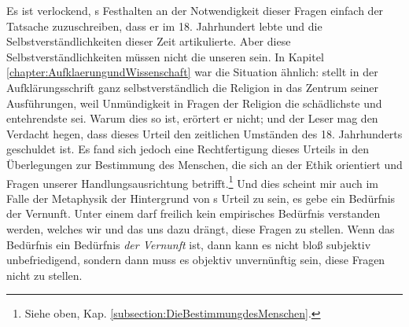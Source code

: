 \begin{nummerierung}
Es ist verlockend, s Festhalten an der Notwendigkeit dieser
Fragen einfach der Tatsache zuzuschreiben, dass er im 18. Jahrhundert lebte und
die Selbstverständlichkeiten dieser Zeit artikulierte. Aber diese
Selbstverständlichkeiten müssen nicht die unseren sein. In Kapitel
\ref{chapter:AufklaerungundWissenschaft} war die Situation ähnlich:
 stellt in der Aufklärungsschrift ganz selbstverständlich
die Religion in das Zentrum seiner Ausführungen, weil Unmündigkeit in Fragen der
Religion die schädlichste und entehrendste sei. Warum dies so ist, erörtert er
nicht; und der Leser mag den Verdacht hegen, dass dieses Urteil den
zeitlichen Umständen des 18. Jahrhunderts geschuldet ist. Es fand sich jedoch eine
Rechtfertigung dieses Urteils in den Überlegungen zur Bestimmung des Menschen,
die sich an der Ethik orientiert und Fragen unserer Handlungsausrichtung
betrifft.\footnote{Siehe oben, Kap. \ref{subsection:DieBestimmungdesMenschen}.}
Und dies scheint mir auch im Falle der Metaphysik der Hintergrund von
s Urteil zu sein, es gebe ein Bedürfnis der Vernunft. Unter
einem  darf freilich kein empirisches Bedürfnis
verstanden werden, welches wir  und das uns dazu drängt,
diese Fragen zu stellen. Wenn das Bedürfnis ein Bedürfnis \emph{der Vernunft}
ist, dann kann es nicht bloß subjektiv unbefriedigend, sondern dann muss es
objektiv unvernünftig sein, diese Fragen nicht zu stellen.


\end{nummerierung}
